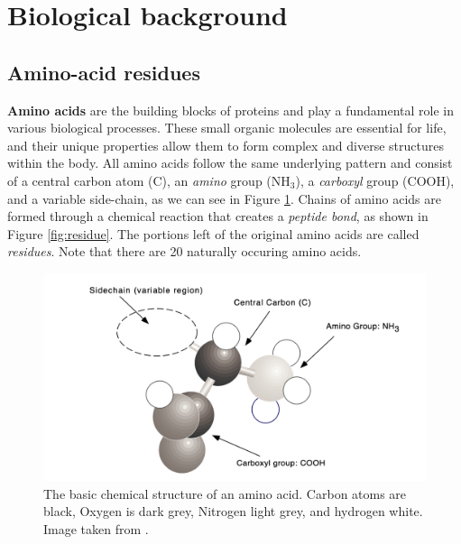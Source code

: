 \section{Biological background}
\subsection{Amino-acid residues}
\label{amino-acids}
\textbf{Amino acids} are the building blocks of proteins and play a fundamental role in various biological processes. These small organic molecules are essential for life, and their unique properties allow them to form complex and diverse structures within the body. 
All amino acids follow the same underlying pattern and consist of a central carbon atom (C), an \textit{amino} group ($\text{NH}_3$), a \textit{carboxyl} group (COOH), and a variable side-chain, as we can see in Figure \ref{fig:amino-acid}.
Chains of amino acids are formed through a chemical reaction that creates a \textit{peptide bond}, as shown in Figure \ref{fig:residue}. The portions left of the original amino acids are called \textit{residues}. Note that there are 20 naturally occuring amino acids.
\begin{figure}
    \centering
    \includegraphics[scale=0.5]{figures/amino-acid.png}
    \caption{The basic chemical structure of an amino acid. Carbon atoms are black, Oxygen is dark grey, Nitrogen light grey, and hydrogen white. Image taken from \cite{hunter1993molecular}.}
    \label{fig:amino-acid}
\end{figure}

